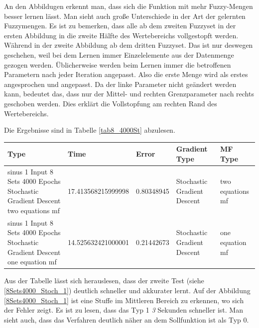 {An den Abbildugen erkennt man, dass sich die Funktion mit mehr Fuzzy-Mengen besser lernen lässt. Man sieht auch große Unterschiede in der Art der gelernten Fuzzymengen. Es ist zu bemerken, dass alle ab dem zweiten Fuzzyset in der ersten Abbildung in die zweite Hälfte des Wertebereichs vollgestopft werden. Während in der zweite Abbildung ab dem dritten Fuzzyset. Das ist nur deswegen geschehen, weil bei dem Lernen immer Einzelelemente aus der Datenmenge gezogen werden. Üblicherweise werden beim Lernen immer die betroffenen Parametern nach jeder Iteration angepasst. Also die erste Menge wird als erstes angesprochen und angepasst. Da der linke Parameter nicht geändert werden kann, bedeutet das, dass nur der Mittel- und rechten Grenzparameter nach rechts geschoben werden. Dies erklärt die Vollstopfung am rechten Rand des Wertebereichs.

Die Ergebnisse sind in Tabelle \ref{tab8_4000St} abzulesen.

\begin{center}
	\begin{minipage}{\textwidth}
	\begin{tabular}{ | p{3cm} | l | l | p{3cm} | p{3cm} |}
		\hline
		Type & Time & Error & Gradient Type & MF Type \\ \hline
		sinus 1 Input 8 Sets 4000 Epochs Stochastic Gradient Descent two equations mf&17.413568215999998&0.80348945&Stochastic Gradient Descent&two equations mf \\ \hline
		sinus 1 Input 8 Sets 4000 Epochs Stochastic Gradient Descent one equation mf&14.525632421000001&0.21442673&Stochastic Gradient Descent&one equation mf\\ \hline
	\end{tabular}
\label{tab8_4000St}
\end{minipage}
\end{center}

Aus der Tabelle lässt sich herauslesen, dass der zweite Test (siehe \ref{8Sets4000_Stoch_1}) deutlich schneller und akkurater lernt. Auf der Abbildung \ref{8Sets4000_Stoch_1} ist eine Stuffe im Mittleren Bereich zu erkennen, wo sich der Fehler zeigt. Es ist zu lesen, dass das Typ 1 \textit{3} Sekunden schneller ist. Man sieht auch, dass das Verfahren deutlich näher an dem Sollfunktion ist als Typ 0.

}

